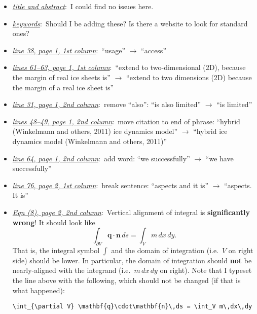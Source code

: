 \documentclass[11pt,reqno]{amsart}
\newcommand{\comm}[2]{\medskip \item[] \underline{\emph{#1}}:\, #2}
\newcommand{\lnpagecol}[4]{\comm{line #1, page #2, #3 column}{#4}}
\newcommand{\lnspagecol}[4]{\comm{lines #1, page #2, #3 column}{#4}}
\newcommand{\eqnpagecol}[4]{\comm{Eqn #1, page #2, #3 column}{#4}}
\begin{document}
\begin{itemize}
\comm{title and abstract}{I could find no issues here.}
\comm{keywords}{Should I be adding these?  Is there a website to look for standard ones?}
\lnpagecol{38}{1}{1st}{``usage'' $\to$ ``access''}
\lnspagecol{61--63}{1}{1st}{``extend to two-dimensional (2D), because the margin of real ice sheets is'' $\to$ ``extend to two dimensions (2D) because the margin of a real ice sheet is''}
\lnpagecol{31}{1}{2nd}{remove ``also'':  ``is also limited'' $\to$ ``is limited''}
\lnspagecol{48--49}{1}{2nd}{move citation to end of phrase:  ``hybrid (Winkelmann and others, 2011) ice dynamics model'' $\to$ ``hybrid ice dynamics model (Winkelmann and others, 2011)''}
\lnpagecol{64}{1}{2nd}{add word: ``we successfully'' $\to$ ``we have successfully''}
\lnpagecol{76}{2}{1st}{break sentence: ``aspects and it is'' $\to$ ``aspects.  It is''}
\eqnpagecol{(8)}{2}{2nd}{Vertical alignment of integral is \textbf{significantly wrong}!  It should look like
   $$\int_{\partial V} \mathbf{q}\cdot\mathbf{n}\,ds = \int_V m\,dx\,dy.$$
That is, the integral symbol $\int$ and the domain of integration (i.e.~$V$ on right side) should be lower.  In particular, the domain of integration should \textbf{not} be nearly-aligned with the integrand (i.e.~$m\,dx\,dy$ on right).  Note that I typeset the line above with the following, which should not be changed (if that is what happened):}

\medskip
\begin{verbatim}
\int_{\partial V} \mathbf{q}\cdot\mathbf{n}\,ds = \int_V m\,dx\,dy
\end{verbatim}
\medskip


\end{itemize}
\end{document}
